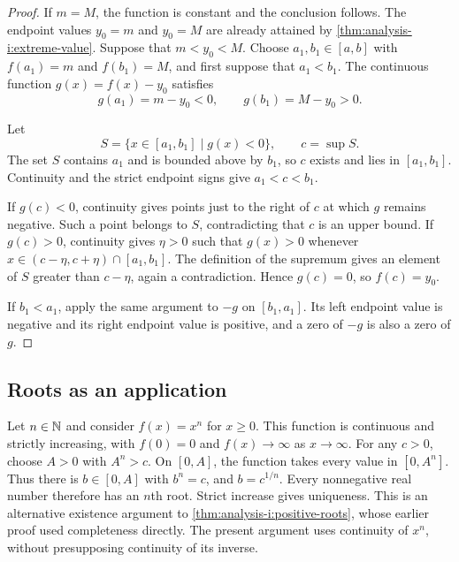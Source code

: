 \begin{proof}
  If $m=M$, the function is constant and the conclusion
    follows. The endpoint values $y_0=m$ and $y_0=M$ are already attained
    by \autoref{thm:analysis-i:extreme-value}.
  Suppose that $m<y_0<M$. Choose $a_1,b_1\in[a,b]$ with
  $f(a_1)=m$ and $f(b_1)=M$, and first suppose that $a_1<b_1$.
  The continuous function $g(x)=f(x)-y_0$ satisfies
  \[
    g(a_1)=m-y_0<0,\qquad g(b_1)=M-y_0>0.
  \]


    Let
    \[
      S=\{x\in[a_1,b_1]\mid g(x)<0\},\qquad c=\sup S.
    \]
    The set $S$ contains $a_1$ and is bounded above by $b_1$, so $c$
    exists and lies in $[a_1,b_1]$. Continuity and the strict endpoint
    signs give $a_1<c<b_1$.

    If $g(c)<0$, continuity gives points just to the right of $c$ at
    which $g$ remains negative. Such a point belongs to $S$,
    contradicting that $c$ is an upper bound. If $g(c)>0$, continuity
    gives $\eta>0$ such that $g(x)>0$ whenever
    $x\in(c-\eta,c+\eta)\cap[a_1,b_1]$. The definition of the supremum
    gives an element of $S$ greater than $c-\eta$, again a
    contradiction. Hence $g(c)=0$, so $f(c)=y_0$.

    If $b_1<a_1$, apply the same argument to $-g$ on $[b_1,a_1]$.
    Its left endpoint value is negative and its right endpoint value
    is positive, and a zero of $-g$ is also a zero of $g$.

\end{proof}

\subsection{Roots as an application}

\begin{example}
  \label{ex:continuity:roots-by-intermediate-value}
  Let $n\in\mathbb{N}$ and consider $f(x)=x^n$ for $x\ge0$. This function is
  continuous and strictly increasing, with $f(0)=0$
  and $f(x)\to\infty$ as $x\to\infty$.
  For any $c>0$, choose $A>0$ with $A^n>c$.
  On $[0,A]$, the function takes every value in $[0,A^n]$. Thus there
  is $b\in[0,A]$ with $b^n=c$, and $b=c^{1/n}$.
  Every nonnegative real number therefore has an $n$th root.
  Strict increase gives uniqueness. This is an
    alternative existence argument to
    \autoref{thm:analysis-i:positive-roots}, whose earlier proof used
    completeness directly. The present argument uses continuity of
    $x^n$, without presupposing continuity of its inverse.
\end{example}

